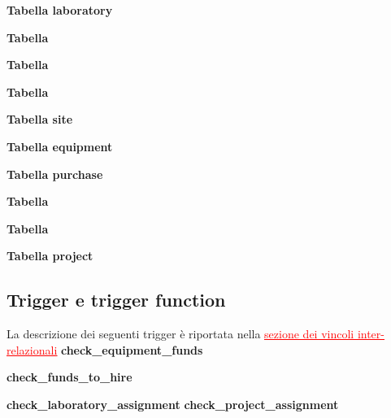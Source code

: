 \newpage
\noindent \textbf{Tabella laboratory}
\bigskip

\noindent \textbf{Tabella \takepart}
\bigskip

\noindent \textbf{Tabella \projectsalaried}
\bigskip

\newpage
\noindent \textbf{Tabella \workson}
\bigskip

\noindent \textbf{Tabella site}
\bigskip

\noindent \textbf{Tabella equipment}
\bigskip

\newpage
\noindent \textbf{Tabella purchase}
\bigskip

\noindent \textbf{Tabella \worksat}
\bigskip

\newpage
\noindent \textbf{Tabella \equipmentrequest}
\bigskip

\noindent \textbf{Tabella project}
\bigskip

\newpage
\subsection{Trigger e trigger function}\label{trigger}
La descrizione dei seguenti trigger è riportata nella \hyperref[vincoli_inter_relazionali]{\textcolor{red}{\underline{sezione dei vincoli inter-relazionali}}}\meskip
\noindent \textbf{check\_equipment\_funds}
\bigskip

\noindent \textbf{check\_funds\_to\_hire}
\bigskip

\newpage
\noindent \textbf{check\_laboratory\_assignment}
\bigskip
\newpage
\noindent \textbf{check\_project\_assignment}
\bigskip

